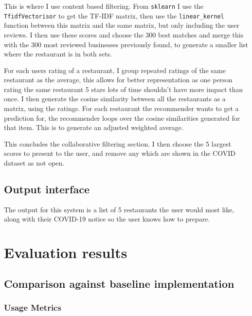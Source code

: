 \documentclass[conference]{IEEEtran}
\begin{document}
This is where I use content based filtering. From \texttt{sklearn} I use the \texttt{TfidfVectorisor} to get the TF-IDF matrix, then use the \texttt{linear\_kernel} function between this matrix and the same matrix, but only including the user reviews. I then use these scores and choose the 300 best matches and merge this with the 300 most reviewed businesses previously found, to generate a smaller list where the restaurant is in both sets.

For each users rating of a restaurant, I group repeated ratings of the same restaurant as the average, this allows for better representation as one person rating the same restaurant 5 stars lots of time shouldn't have more impact than once. I then generate the cosine similarity between all the restaurants as a matrix, using the ratings. For each restaurant the recommender wants to get a prediction for, the recommender loops over the cosine similarities generated for that item. This is to generate an adjusted weighted average.

This concludes the collaborative filtering section. I then choose the 5 largest scores to present to the user, and remove any which are shown in the COVID dataset as not open.

\subsection{Output interface}

The output for this system is a list of 5 restaurants the user would most like, along with their COVID-19 notice so the user knows how to prepare.

\section{Evaluation results}

\subsection{Comparison against baseline implementation}

\subsubsection{Usage Metrics}
\end{document}
